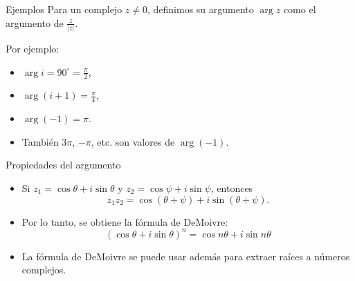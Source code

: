 \documentclass[spanish,presentation]{beamer}
\begin{document}
\begin{frame}[label=sec-2-2]{Ejemplos}
Para un complejo \(z\ne 0\), definimos su \alert{argumento} \(\arg z\) como
el argumento de \(\frac{z}{|z|}\).

Por ejemplo:

\begin{itemize}
\item \(\arg i=90^{\circ}=\frac{\pi}{2}\),
\item \(\arg(i+1)=\frac{\pi}{4}\),
\item \(\arg(-1)=\pi\).
\item También \(3\pi\), \(-\pi\), etc. son valores de \(\arg(-1)\).
\end{itemize}
\end{frame}

\begin{frame}[label=sec-2-3]{Propiedades del argumento}
\begin{itemize}
\item Si \(z_{1}=\cos\theta+i\sin\theta\) y
\(z_{2}=\cos\psi+i\sin\psi\), entonces 
\begin{displaymath}
z_{1}z_{2}=\cos(\theta+\psi)+i\sin(\theta+\psi).
\end{displaymath}
\item Por lo tanto, se obtiene la \alert{fórmula de DeMoivre}:
\begin{displaymath}
(\cos\theta+i\sin\theta)^{n}=\cos n\theta+i\sin n\theta
\end{displaymath}
\item La fórmula de DeMoivre se puede usar además para extraer raíces a
números complejos.
\end{itemize}
\end{frame}
\end{document}
